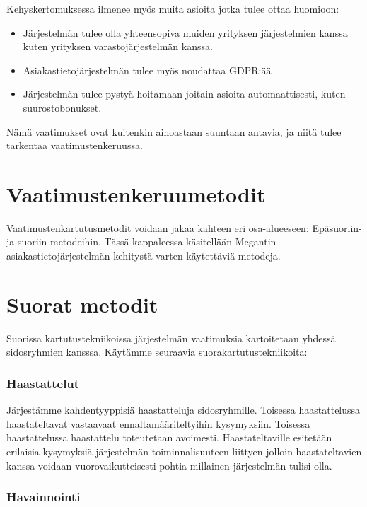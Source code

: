     Kehyskertomuksessa ilmenee myös muita asioita jotka tulee ottaa huomioon:
    
    \begin{itemize}
        \item Järjestelmän tulee olla yhteensopiva muiden yrityksen järjestelmien kanssa kuten yrityksen varastojärjestelmän kanssa.
        \item Asiakastietojärjestelmän tulee myös noudattaa GDPR:ää %
        \item Järjestelmän tulee pystyä hoitamaan joitain asioita automaattisesti, kuten suurostobonukset.
    \end{itemize}

    Nämä vaatimukset ovat kuitenkin ainoastaan suuntaan antavia, ja niitä tulee tarkentaa vaatimustenkeruussa. 


\section{Vaatimustenkeruumetodit}

    Vaatimustenkartutusmetodit voidaan jakaa kahteen eri osa-alueeseen: Epäsuoriin- ja suoriin metodeihin.
    Tässä kappaleessa käsitellään Megantin asiakastietojärjestelmän kehitystä varten käytettäviä metodeja.


    \section*{Suorat metodit}

        Suorissa kartutustekniikoissa järjestelmän vaatimuksia kartoitetaan yhdessä sidosryhmien kansssa.
        Käytämme seuraavia suorakartutustekniikoita:

        \subsubsection*{Haastattelut}

            Järjestämme kahdentyyppisiä haastatteluja sidosryhmille. Toisessa haastattelussa haastateltavat vastaavaat ennaltamääriteltyihin kysymyksiin. 
            Toisessa haastattelussa haastattelu toteutetaan avoimesti. Haastateltaville esitetään erilaisia kysymyksiä järjestelmän toiminnalisuuteen liittyen jolloin
            haastateltavien kanssa voidaan vuorovaikutteisesti pohtia millainen järjestelmän tulisi olla.

        \subsubsection*{Havainnointi}

